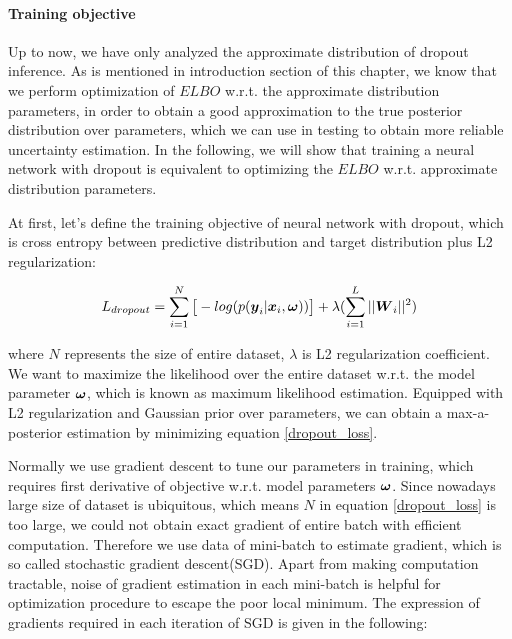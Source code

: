 \paragraph{Training objective} Up to now, we have only analyzed the approximate distribution of dropout inference. As is mentioned in introduction section of this chapter, we know that we perform optimization of $ELBO$ w.r.t. the approximate distribution parameters, in order to obtain a good approximation to the true posterior distribution over parameters, which we can use in testing to obtain more reliable uncertainty estimation. In the following, we will show that training a neural network with dropout is equivalent to optimizing the $ELBO$ w.r.t. approximate distribution parameters.

At first, let's define the training objective of neural network with dropout, which is cross entropy between predictive distribution and target distribution plus L2 regularization:

\begin{equation}
\begin{aligned} \label{dropout_loss}
L_{dropout}   = \sum_{i=1}^{N}\big[-log(p(\boldsymbol y_{i}| \boldsymbol x_{i}, \boldsymbol \omega))\big] + \lambda(\sum_{i=1}^{L} ||\boldsymbol W_{i}||^{2})
\end{aligned}
\end{equation}

where $N$ represents the size of entire dataset, $\lambda$ is L2 regularization coefficient. We want to maximize the likelihood over the entire dataset w.r.t. the model parameter $\boldsymbol \omega$, which is known as maximum likelihood estimation. Equipped with L2 regularization and Gaussian prior over parameters, we can obtain a max-a-posterior estimation by minimizing equation \ref{dropout_loss}. 

Normally we use gradient descent to tune our parameters in training, which requires first derivative of objective w.r.t. model parameters $\boldsymbol \omega$. Since nowadays large size of dataset is ubiquitous, which means $N$ in equation \ref{dropout_loss} is too large, we could not obtain exact gradient of entire batch with efficient computation. Therefore we use data of mini-batch to estimate gradient, which is so called stochastic gradient descent(SGD). Apart from making computation tractable, noise of gradient estimation in each mini-batch is helpful for optimization procedure to escape the poor local minimum. The expression of gradients required in each iteration of SGD is given in the following:

